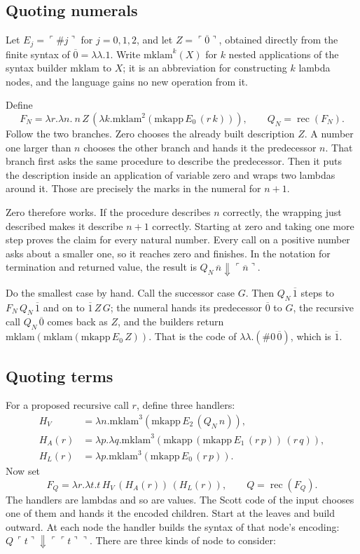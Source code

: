 \documentclass[11pt,twoside]{article}
\theoremstyle{thielethm}
\theoremstyle{thieledef}
\theoremstyle{thieledef}
\theoremstyle{thieledef}
\theoremstyle{thielethm}
\theoremstyle{thieleobs}
\theoremstyle{thielethm}
\begin{document}
\subsection{Quoting numerals}

Let $E_j=\ulcorner\#j\urcorner$ for $j=0,1,2$, and let
$Z=\ulcorner\overline0\urcorner$, obtained directly from the finite syntax of
$\overline0=\lambda\lambda.1$. Write $\mathrm{mklam}^k(X)$ for $k$ nested applications of the
syntax builder $\mathrm{mklam}$ to $X$; it is an abbreviation for constructing $k$ lambda nodes, and the
language gains no new operation from it.

Define
\[
F_N=\lambda r.\lambda n.\ n\,Z\,
       (\lambda k.\mathrm{mklam}^2(\mathrm{mkapp}\,E_0\,(r\,k))),
\qquad Q_N=\operatorname{rec}(F_N).
\]
Follow the two branches. Zero chooses the already built description $Z$.
A number one larger than $n$ chooses the other branch and hands it the
predecessor $n$. That branch first asks the same procedure to describe the
predecessor. Then it puts the description inside an application of variable
zero and wraps two lambdas around it. Those are precisely the marks in the
numeral for $n+1$.

Zero therefore works. If the procedure describes $n$ correctly, the wrapping
just described makes it describe $n+1$ correctly. Starting at zero and taking
one more step proves the claim for every natural number. Every call on a
positive number asks about a smaller one, so it reaches zero and finishes.
In the notation for termination and returned value, the result is
$Q_N\,\overline n\Downarrow\ulcorner\overline n\urcorner$.

Do the smallest case by hand. Call the successor case $G$. Then $Q_N\,\overline1$ steps to
$F_N\,Q_N\,\overline1$ and on to $\overline1\,Z\,G$; the numeral hands its predecessor
$\overline0$ to $G$, the recursive call $Q_N\,\overline0$ comes back as $Z$, and the builders
return $\mathrm{mklam}(\mathrm{mklam}(\mathrm{mkapp}\,E_0\,Z))$. That is the code of
$\lambda\lambda.(\#0\,\overline0)$, which is $\overline1$.

\subsection{Quoting terms}

For a proposed recursive call $r$, define three handlers:
\[
\begin{aligned}
H_V&=\lambda n.\mathrm{mklam}^3(\mathrm{mkapp}\,E_2\,(Q_N\,n)),\\
H_A(r)&=\lambda p.\lambda q.\mathrm{mklam}^3(\mathrm{mkapp}\,(\mathrm{mkapp}\,E_1\,(r\,p))\,(r\,q)),\\
H_L(r)&=\lambda p.\mathrm{mklam}^3(\mathrm{mkapp}\,E_0\,(r\,p)).
\end{aligned}
\]
Now set
\[
F_Q=\lambda r.\lambda t.t\,H_V\,(H_A(r))\,(H_L(r)),
\qquad Q=\operatorname{rec}(F_Q).
\]
The handlers are lambdas and so are values. The Scott code of the input chooses
one of them and hands it the encoded children. Start at the leaves and build
outward. At each node the handler builds the syntax of that node's encoding:
$Q\,\ulcorner t\urcorner\Downarrow\ulcorner\ulcorner t\urcorner\urcorner$. There are
three kinds of node to consider:
\end{document}
